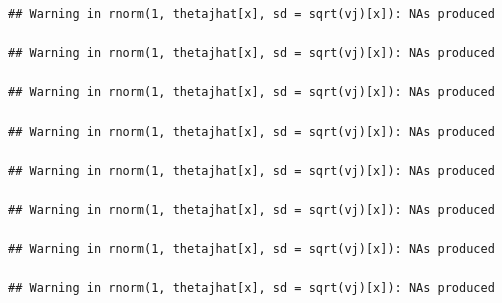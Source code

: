 \documentclass[
]{book}
\newenvironment{Shaded}{\begin{snugshade}}{\end{snugshade}}
\newcommand{\AttributeTok}[1]{\textcolor[rgb]{0.77,0.63,0.00}{#1}}
\newcommand{\ConstantTok}[1]{\textcolor[rgb]{0.00,0.00,0.00}{#1}}
\newcommand{\ControlFlowTok}[1]{\textcolor[rgb]{0.13,0.29,0.53}{\textbf{#1}}}
\newcommand{\DecValTok}[1]{\textcolor[rgb]{0.00,0.00,0.81}{#1}}
\newcommand{\FloatTok}[1]{\textcolor[rgb]{0.00,0.00,0.81}{#1}}
\newcommand{\FunctionTok}[1]{\textcolor[rgb]{0.00,0.00,0.00}{#1}}
\newcommand{\NormalTok}[1]{#1}
\newcommand{\OtherTok}[1]{\textcolor[rgb]{0.56,0.35,0.01}{#1}}
\newcommand{\SpecialCharTok}[1]{\textcolor[rgb]{0.00,0.00,0.00}{#1}}
\theoremstyle{definition}
\theoremstyle{definition}
\theoremstyle{definition}
\theoremstyle{definition}
\theoremstyle{remark}
\begin{document}
\begin{Shaded}
\end{Shaded}

\begin{verbatim}
## Warning in rnorm(1, thetajhat[x], sd = sqrt(vj)[x]): NAs produced

## Warning in rnorm(1, thetajhat[x], sd = sqrt(vj)[x]): NAs produced

## Warning in rnorm(1, thetajhat[x], sd = sqrt(vj)[x]): NAs produced

## Warning in rnorm(1, thetajhat[x], sd = sqrt(vj)[x]): NAs produced

## Warning in rnorm(1, thetajhat[x], sd = sqrt(vj)[x]): NAs produced

## Warning in rnorm(1, thetajhat[x], sd = sqrt(vj)[x]): NAs produced

## Warning in rnorm(1, thetajhat[x], sd = sqrt(vj)[x]): NAs produced

## Warning in rnorm(1, thetajhat[x], sd = sqrt(vj)[x]): NAs produced
\end{verbatim}
\end{document}

